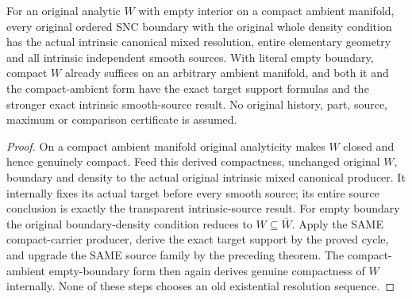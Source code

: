 \begin{theorem}
\label{hir:original-nonpure-compact-ambient-exact-specializations}
For an original analytic $W$ with empty interior on a compact ambient
manifold, every original ordered SNC boundary with the original
whole density condition has the actual intrinsic canonical mixed
resolution, entire elementary geometry and all intrinsic independent
smooth sources. With literal empty boundary, compact $W$ already
suffices on an arbitrary ambient manifold, and both it and the
compact-ambient form have the exact target support formulas and the
stronger exact intrinsic smooth-source result. No original history,
part, source, maximum or comparison certificate is assumed.
\leanok
\end{theorem}
\begin{proof}
On a compact ambient manifold original analyticity makes $W$ closed
and hence genuinely compact. Feed this derived compactness, unchanged
original $W$, boundary and density to the actual original intrinsic
mixed canonical producer. It internally fixes its actual target
before every smooth source; its entire source conclusion is exactly
the transparent intrinsic-source result. For empty boundary the
original boundary-density condition reduces to $W\subseteq\overline W$.
Apply the SAME compact-carrier producer, derive the exact target
support by the proved cycle, and upgrade the SAME source family by
the preceding theorem. The compact-ambient empty-boundary form then
again derives genuine compactness of $W$ internally. None of these
steps chooses an old existential resolution sequence.
\end{proof}

